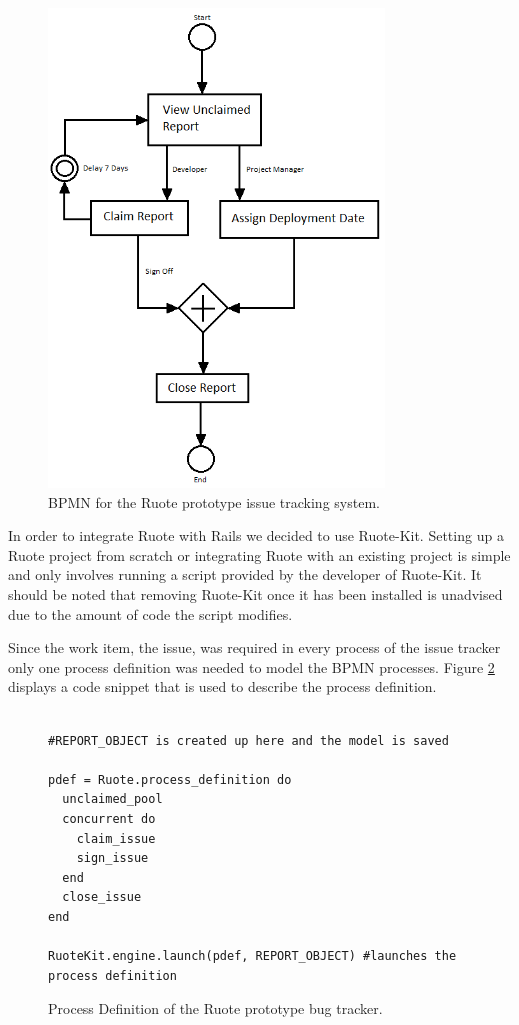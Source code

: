 \documentclass[document.tex]{subfiles}
\begin{document}
\begin{figure}[!ht]
\centering \includegraphics[height=5in]{./img/prototypes/ruote-bpmn-diagram}
\caption{BPMN for the Ruote prototype issue tracking system.}
\label{fig:ruote-bpmn-diagram}
\end{figure}

In order to integrate Ruote with Rails we decided to use Ruote-Kit. Setting up a Ruote project from scratch or integrating Ruote with an existing project is simple and only involves running a script provided by the developer of Ruote-Kit. It should be noted that removing Ruote-Kit once it has been installed is unadvised due to the amount of code the script modifies.

Since the work item, the issue, was required in every process of the issue tracker only one process definition was needed to model the BPMN processes. Figure \ref{fig:ruote-prototype-process-definition} displays a code snippet that is used to describe the process definition. 

\begin{figure}[!ht]
  \begin{lstlisting}

#REPORT_OBJECT is created up here and the model is saved

pdef = Ruote.process_definition do
  unclaimed_pool
  concurrent do
    claim_issue
    sign_issue
  end
  close_issue
end

RuoteKit.engine.launch(pdef, REPORT_OBJECT) #launches the process definition

  \end{lstlisting}
  \caption{Process Definition of the Ruote prototype bug tracker.}
  \label{fig:ruote-prototype-process-definition}
\end{figure}
\end{document}
